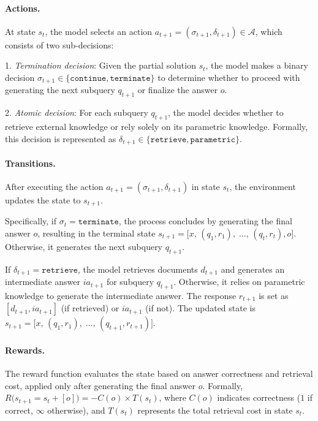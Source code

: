 \paragraph{Actions.}
At state \(s_t\), the model selects an action \(a_{t+1} = (\sigma_{t+1}, \delta_{t+1}) \in \mathcal{A}\), which consists of two sub-decisions:

1. \emph{Termination decision}:  Given the partial solution \(s_t\), the model makes a binary decision \(\sigma_{t+1} \in \{\texttt{continue}, \texttt{terminate}\}\) to determine whether to proceed with generating the next subquery \(q_{t+1}\) or finalize the answer \(o\). 

2. \emph{Atomic decision}: For each subquery \(q_{t+1}\), the model decides whether to retrieve external knowledge or rely solely on its parametric knowledge. Formally, this decision is represented as \(\delta_{t+1} \in \{\texttt{retrieve}, \texttt{parametric}\}\).


\paragraph{Transitions.}  
After executing the action \(a_{t+1} = (\sigma_{t+1}, \delta_{t+1})\) in state \(s_t\), the environment updates the state to \(s_{t+1}\).  

Specifically, if \(\sigma_t = \texttt{terminate}\), the process concludes by generating the final answer \(o\), resulting in the terminal state \(s_{t+1} = \bigl[x,\,(q_1,r_1),\;\dots,\,(q_{t}, r_{t}), o\bigr]\). Otherwise, it generates the next subquery \(q_{t+1}\).  

If \(\delta_{t+1} = \texttt{retrieve}\), the model retrieves documents \(d_{t+1}\) and generates an intermediate answer \(ia_{t+1}\) for subquery \(q_{t+1}\). Otherwise, it relies on parametric knowledge to generate the intermediate answer. 
The response \(r_{t+1}\) is set as \([d_{t+1}, ia_{t+1}]\) (if retrieved) or \(ia_{t+1}\) (if not). The updated state is  
\(s_{t+1} = \bigl[x,\,(q_1,r_1),\;\dots,\,(q_{t+1}, r_{t+1})\bigr]\).

\paragraph{Rewards.}  
The reward function evaluates the state based on answer correctness and retrieval cost, applied only after generating the final answer \(o\). Formally,  
$R\bigl(s_{t+1} = s_t+[o]\bigr) = -C(o) \times T(s_t)$,
where \(C(o)\) indicates correctness (\(1\) if correct, \(\infty\) otherwise), and \(T(s_t)\) represents the total retrieval cost in state \(s_t\).

